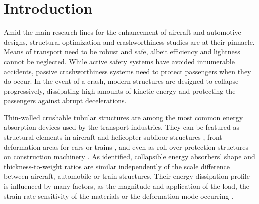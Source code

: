\documentclass[12pt,number,preprint,review,times]{elsarticle}
\begin{document}

 

\section{Introduction}
 






Amid the main research lines for the enhancement of aircraft and automotive designs, structural optimization and crashworthiness studies are at their pinnacle. Means of transport need to be robust and safe, albeit efficiency and lightness cannot be neglected. While active safety systems have avoided innumerable accidents, passive crashworthiness systems need to protect passengers when they do occur. In the event of a crash, modern structures are designed to collapse progressively, dissipating high amounts of kinetic energy and protecting the passengers against abrupt decelerations. 

Thin-walled crushable tubular structures are among the most common energy absorption devices used by the transport industries. They can be featured as structural elements in aircraft and helicopter subfloor structures \citep{Paz2019IJCW,Paz2020,bisagni2002crashworthiness}, front deformation areas for cars \citep{White1999179,White1999209} or trains \citep{marsolek2004energy}, and even as roll-over protection structures on construction machinery \citep{ahmad2009application}. As \citet{alghamdi2001collapsible} identified, collapsible energy absorbers' shape and thickness-to-weight ratios are similar independently of the scale difference between aircraft, automobile or train structures. Their energy dissipation profile is influenced by many factors, as the magnitude and application of the load, the strain-rate sensitivity of the materials or the deformation mode occurring \citep{johnson1978metallic}. 
\end{document}
